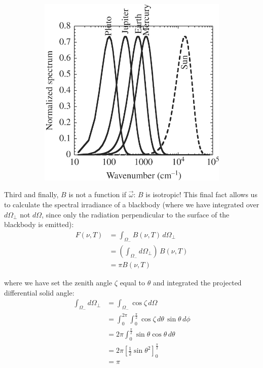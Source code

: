 \begin{figure}[H]
\begin{subfigure}{0.25\linewidth}
        \includegraphics[width=\linewidth]{Figures/Radiative Transfer/Spectral Gap.jpg}
    \end{subfigure}
\end{figure}

Third and finally, $B$ is not a function if $\vec{\omega}$: $B$ is isotropic! This final fact allows us to calculate the spectral irradiance of a blackbody (where we have integrated over $d\Omega_\perp$ not  $d\Omega$, since only the radiation perpendicular to the surface of the blackbody is emitted):
\begin{align*}
    F(\nu,T)&=\int_{\Omega_-} B(\nu,T)\,d\Omega_\perp\\
    &= \left( \int_{\Omega_-}d\Omega_{\perp} \right)\,B(\nu,T)\\
    &=\pi B(\nu,T)
\end{align*}

\noindent where we have set the zenith angle $\zeta$ equal to $\theta$ and integrated the projected differential solid angle:
\begin{align*}
    \int_{\Omega_-}d\Omega_\perp&=\int_{\Omega_-} \cos \zeta \,d\Omega\\
    &=\int_{0}^{2\pi}\int_{0}^{\frac{\pi}{2}} \cos \zeta \,d\theta \,\sin\theta \,d\phi\\
    &=2\pi \int_{0}^{\frac{\pi}{2}}\sin\theta\cos\theta\,d\theta\\
    &=2\pi\left[ \frac{1}{2}\sin\theta^2 \right]_0^{\frac{\pi}{2}}\\
    &=\pi
\end{align*}

